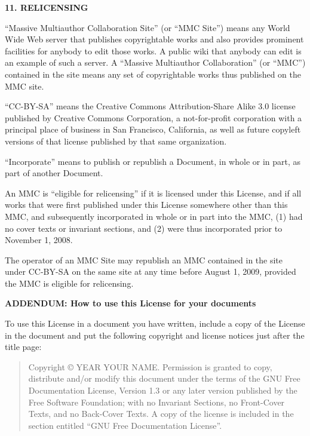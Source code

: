 \begin{center}
{\Large\bf 11. RELICENSING\par}
{}
\end{center}


``Massive Multiauthor Collaboration Site'' (or ``MMC Site'') means any
World Wide Web server that publishes copyrightable works and also
provides prominent facilities for anybody to edit those works.  A
public wiki that anybody can edit is an example of such a server.  A
``Massive Multiauthor Collaboration'' (or ``MMC'') contained in the
site means any set of copyrightable works thus published on the MMC
site.

``CC-BY-SA'' means the Creative Commons Attribution-Share Alike 3.0
license published by Creative Commons Corporation, a not-for-profit
corporation with a principal place of business in San Francisco,
California, as well as future copyleft versions of that license
published by that same organization.

``Incorporate'' means to publish or republish a Document, in whole or
in part, as part of another Document.

An MMC is ``eligible for relicensing'' if it is licensed under this
License, and if all works that were first published under this License
somewhere other than this MMC, and subsequently incorporated in whole
or in part into the MMC, (1) had no cover texts or invariant sections,
and (2) were thus incorporated prior to November 1, 2008.

The operator of an MMC Site may republish an MMC contained in the site
under CC-BY-SA on the same site at any time before August 1, 2009,
provided the MMC is eligible for relicensing.


\begin{center}
{\Large\bf ADDENDUM: How to use this License for your documents\par}
{}
\end{center}

To use this License in a document you have written, include a copy of
the License in the document and put the following copyright and
license notices just after the title page:

\bigskip
\begin{quote}
    Copyright \copyright{}  YEAR  YOUR NAME.
    Permission is granted to copy, distribute and/or modify this document
    under the terms of the GNU Free Documentation License, Version 1.3
    or any later version published by the Free Software Foundation;
    with no Invariant Sections, no Front-Cover Texts, and no Back-Cover Texts.
    A copy of the license is included in the section entitled ``GNU
    Free Documentation License''.
\end{quote}
\bigskip
    
